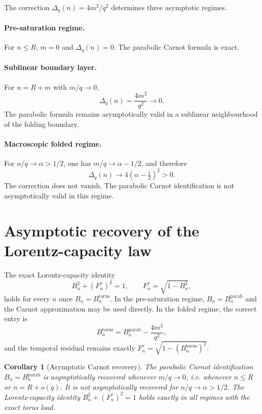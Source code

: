 \documentclass[12pt,a4paper]{article}
\newtheorem{corollary}[theorem]{Corollary}
\theoremstyle{remark}
\begin{document}
    The correction $\Delta_q(n) = 4m^2/q^2$ determines three asymptotic regimes.

    \paragraph{Pre-saturation regime.}
      For $n \leq R$, $m = 0$ and $\Delta_q(n) = 0$.
      The parabolic Carnot formula is exact.

    \paragraph{Sublinear boundary layer.}
      For $n = R + m$ with $m/q \to 0$,
      \[
        \Delta_q(n) = \frac{4m^2}{q^2} \to 0.
      \]
      The parabolic formula remains asymptotically valid in a sublinear neighbourhood of the
      folding boundary.

    \paragraph{Macroscopic folded regime.}
      For $n/q \to \alpha > 1/2$, one has $m/q \to \alpha - 1/2$, and therefore
      \[
        \Delta_q(n) \to 4\!\left(\alpha - \tfrac{1}{2}\right)^2 > 0.
      \]
      The correction does not vanish.
      The parabolic Carnot identification is not asymptotically valid in this regime.

  \section{Asymptotic recovery of the Lorentz-capacity law}
  \label{sec:recovery}

  The exact Lorentz-capacity identity
  \[
    B_n^2 + (F^\tau_n)^2 = 1, \qquad F^\tau_n = \sqrt{1 - B_n^2},
  \]
  holds for every $n$ once $B_n = B_n^{\mathrm{torus}}$.
  In the pre-saturation regime, $B_n = B_n^{\mathrm{parab}}$ and the Carnot
  approximation may be used directly.
  In the folded regime, the correct entry is
  \[
    B_n^{\mathrm{torus}} = B_n^{\mathrm{parab}} - \frac{4m^2}{q^2},
  \]
  and the temporal residual remains exactly $F^\tau_n = \sqrt{1-(B_n^{\mathrm{torus}})^2}$.

  \begin{corollary}[Asymptotic Carnot recovery]
    \label{cor:recovery}
    The parabolic Carnot identification $B_n = B_n^{\mathrm{parab}}$ is asymptotically
    recovered whenever $m/q \to 0$, i.e. whenever $n \leq R$ or $n = R + o(q)$.
    It is not asymptotically recovered for $n/q \to \alpha > 1/2$.
    The Lorentz-capacity identity $B_n^2 + (F^\tau_n)^2 = 1$ holds exactly in all
    regimes with the exact torus load.
  \end{corollary}
\end{document}
